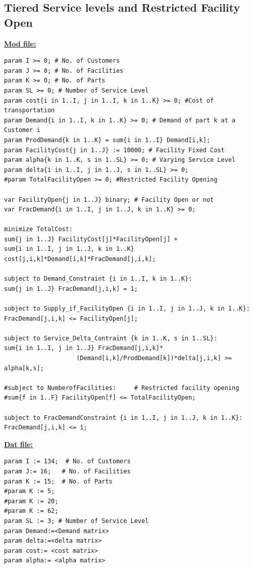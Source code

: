 \documentclass[12pt]{article}
\numberwithin{equation}{section}
\begin{document}
\subsection{Tiered Service levels and Restricted Facility Open}
\textbf{\underline{Mod file:}}
\begin{verbatim}
param I >= 0; # No. of Customers
param J >= 0; # No. of Facilities
param K >= 0; # No. of Parts
param SL >= 0; # Number of Service Level
param cost{i in 1..I, j in 1..I, k in 1..K} >= 0; #Cost of transportation
param Demand{i in 1..I, k in 1..K} >= 0; # Demand of part k at a Customer i
param ProdDemand{k in 1..K} = sum{i in 1..I} Demand[i,k];
param FacilityCost{j in 1..J} := 10000; # Facility Fixed Cost
param alpha{k in 1..K, s in 1..SL} >= 0; # Varying Service Level
param delta{i in 1..I, j in 1..J, s in 1..SL} >= 0; 
#param TotalFacilityOpen >= 0; #Restricted Facility Opening

var FacilityOpen{j in 1..J} binary; # Facility Open or not
var FracDemand{i in 1..I, j in 1..J, k in 1..K} >= 0;

minimize TotalCost:
sum{j in 1..J} FacilityCost[j]*FacilityOpen[j] + 
sum{i in 1..I, j in 1..J, k in 1..K} cost[j,i,k]*Demand[i,k]*FracDemand[j,i,k];

subject to Demand_Constraint {i in 1..I, k in 1..K}:
sum{j in 1..J} FracDemand[j,i,k] = 1;

subject to Supply_if_FacilityOpen {i in 1..I, j in 1..J, k in 1..K}:
FracDemand[j,i,k] <= FacilityOpen[j];

subject to Service_Delta_Contraint {k in 1..K, s in 1..SL}:
sum{i in 1..I, j in 1..J} FracDemand[j,i,k]*
                    (Demand[i,k]/ProdDemand[k])*delta[j,i,k] >= alpha[k,s];
                    
#subject to NumberofFacilities:     # Restricted facility opening
#sum{f in 1..F} FacilityOpen[f] <= TotalFacilityOpen;

subject to FracDemandConstraint {i in 1..I, j in 1..J, k in 1..K}:
FracDemand[j,i,k] <= 1;
\end{verbatim}
\textbf{\underline{Dat file:}}
\begin{verbatim}
param I := 134;  # No. of Customers
param J:= 16;   # No. of Facilities
param K := 15;  # No. of Parts
#param K := 5;
#param K := 20;
#param K := 62;
param SL := 3; # Number of Service Level
param Demand:=<Demand matrix>
param delta:=<delta matrix>
param cost:= <cost matrix>
param alpha:= <alpha matrix>
\end{verbatim}
\end{document}
